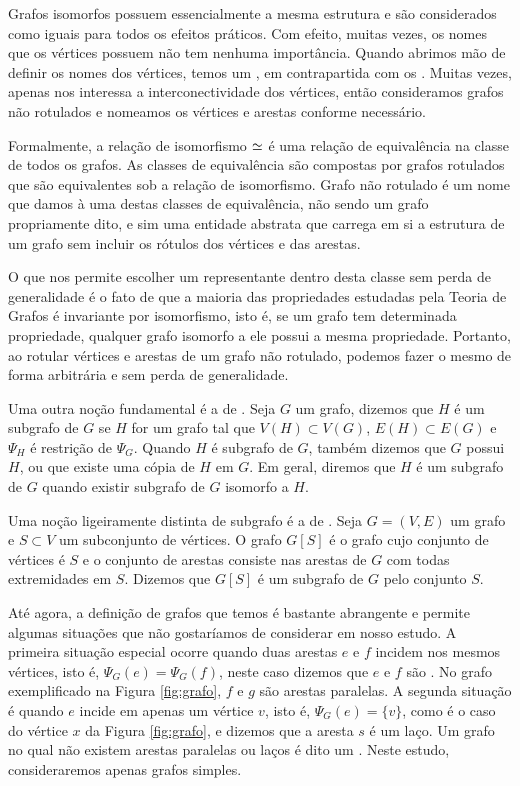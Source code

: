 Grafos isomorfos possuem essencialmente a mesma estrutura e são considerados como iguais para todos os efeitos práticos. Com efeito, muitas vezes, os nomes que os vértices possuem não tem nenhuma importância. Quando abrimos mão de definir os nomes dos vértices, temos um , em contrapartida com os . Muitas vezes, apenas nos interessa a interconectividade dos vértices, então consideramos grafos não rotulados e nomeamos os vértices e arestas conforme necessário.

Formalmente, a relação de isomorfismo $\operatorname{\simeq}$ é uma relação de equivalência na classe de todos os grafos. As classes de equivalência são compostas por grafos rotulados que são equivalentes sob a relação de isomorfismo. Grafo não rotulado é um nome que damos à uma destas classes de equivalência, não sendo um grafo propriamente dito, e sim uma entidade abstrata que carrega em si a estrutura de um grafo sem incluir os rótulos dos vértices e das arestas.

O que nos permite escolher um representante dentro desta classe sem perda de generalidade é o fato de que a maioria das propriedades estudadas pela Teoria de Grafos é invariante por isomorfismo, isto é, se um grafo tem determinada propriedade, qualquer grafo isomorfo a ele possui a mesma propriedade. Portanto, ao rotular vértices e arestas de um grafo não rotulado, podemos fazer o mesmo de forma arbitrária e sem perda de generalidade.

Uma outra noção fundamental é a de . Seja $G$ um grafo, dizemos que $H$ é um subgrafo de $G$ se $H$ for um grafo tal que $V(H) \subset V(G)$, $E(H) \subset E(G)$ e $\Psi_H$ é restrição de $\Psi_G$. Quando $H$ é subgrafo de $G$, também dizemos que $G$ possui $H$, ou que existe uma cópia de $H$ em $G$. Em geral, diremos que $H$ é um subgrafo de $G$ quando existir subgrafo de $G$ isomorfo a $H$.

Uma noção ligeiramente distinta de subgrafo é a de . Seja $G = (V,E)$ um grafo e $S \subset V$ um subconjunto de vértices. O grafo $G[S]$ é o grafo cujo conjunto de vértices é $S$ e o conjunto de arestas consiste nas arestas de $G$ com todas extremidades em $S$. Dizemos que $G[S]$ é um subgrafo de $G$  pelo conjunto $S$.

Até agora, a definição de grafos que temos é bastante abrangente e permite algumas situações que não gostaríamos de considerar em nosso estudo. A primeira situação especial ocorre quando duas arestas $e$ e $f$ incidem nos mesmos vértices, isto é, $\Psi_G(e) = \Psi_G(f)$, neste caso dizemos que $e$ e $f$ são . No grafo exemplificado na Figura \ref{fig:grafo}, $f$ e $g$ são arestas paralelas. A segunda situação é quando $e$ incide em apenas um vértice $v$, isto é, $\Psi_G(e) = \{v\}$, como é o caso do vértice $x$ da Figura \ref{fig:grafo}, e dizemos que a aresta $s$ é um laço. Um grafo no qual não existem arestas paralelas ou laços é dito um . Neste estudo, consideraremos apenas grafos simples.

